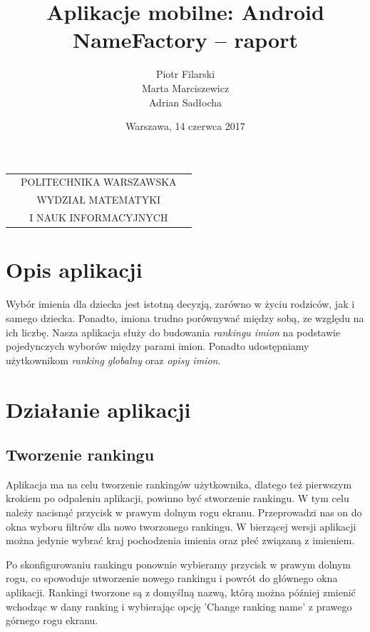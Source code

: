 \documentclass[12pt,a4paper]{article}
\begin{document}
\begin{table}[t]
\centering
\begin{tabular}[t]{lcr}
& POLITECHNIKA WARSZAWSKA & \\
& WYDZIAŁ MATEMATYKI & \\
& I NAUK INFORMACYJNYCH &
\end{tabular}
\end{table}

\author{Piotr Filarski \\ Marta Marciszewicz \\ Adrian Sadłocha}
\title{Aplikacje mobilne: Android \\ NameFactory -- raport}
\date{Warszawa, 14 czerwca 2017}

\maketitle

\section*{Opis aplikacji}
Wybór imienia dla dziecka jest istotną decyzją, zarówno w życiu rodziców, jak i samego dziecka.
Ponadto, imiona trudno porównywać między sobą, ze względu na ich liczbę.
Nasza aplikacja służy do budowania \textit{rankingu imion} na podstawie pojedynczych wyborów między parami imion.
Ponadto udostępniamy użytkownikom \textit{ranking globalny} oraz \textit{opisy imion}.
\newpage

\section{Działanie aplikacji}
\subsection{Tworzenie rankingu}

Aplikacja ma na celu tworzenie rankingów użytkownika, dlatego też pierwszym krokiem po odpaleniu aplikacji, powinno być stworzenie rankingu.
W tym celu należy nacisnąć przycisk w prawym dolnym rogu ekranu.
Przeprowadzi nas on do okna wyboru filtrów dla nowo tworzonego rankingu.
W bierzącej wersji aplikacji można jedynie wybrać kraj pochodzenia imienia oraz płeć związaną z imieniem.

Po skonfigurowaniu rankingu ponownie wybieramy przycisk w prawym dolnym rogu, co spowoduje utworzenie nowego rankingu i powrót do głównego okna aplikacji.
Rankingi tworzone są z domyślną nazwą, którą można później zmienić wchodząc w dany ranking i wybierając opcję 'Change ranking name' z prawego górnego rogu ekranu.
\end{document}
